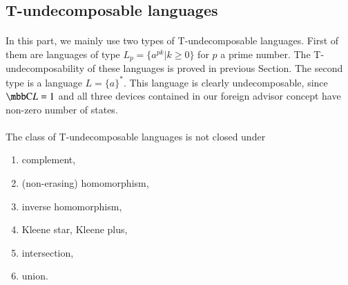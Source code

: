 \subsection{T-undecomposable languages}
\paragraph{}
In this part, we mainly use two types of T-undecomposable languages. First of them are languages of type $L_p = \{ a^{pk} | k \geq 0 \}$ for $p$ a prime number. The T-undecomposability of these languages is proved in previous Section. The second type is a language $L = \{ a \}^*$. This language is clearly undecomposable, since $\C{L} = 1$ and all three devices contained in our foreign advisor concept have non-zero number of states.

\paragraph{}
\cveta The class of T-undecomposable languages is not closed under 
\begin{enumerate}
\item complement,
\item (non-erasing) homomorphism,
\item inverse homomorphism,
\item Kleene star, Kleene plus,
\item intersection,
\item union.
\end{enumerate}

